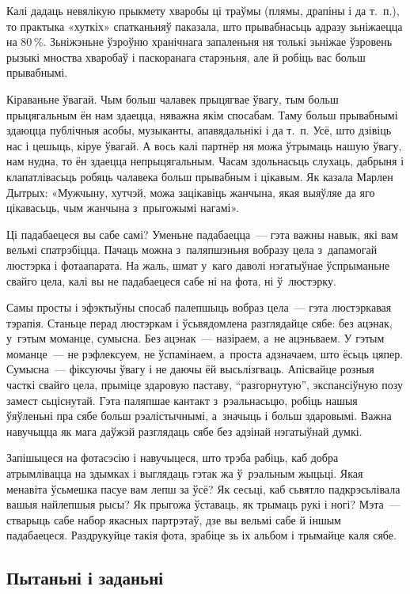 Калі дадаць невялікую прыкмету хваробы ці траўмы (плямы, драпіны і да т.~п.), то практыка «хуткіх» спатканьняў паказала, што прывабнасьць адразу зьніжаецца на 80\,\%. Зьніжэньне ўзроўню хранічнага запаленьня ня толькі зьніжае ўзровень рызыкі мноства хваробаў і паскоранага старэньня, але й робіць вас больш прывабнымі.

Кіраваньне ўвагай. Чым больш чалавек прыцягвае ўвагу, тым больш прыцягальным ён нам здаецца, няважна якім спосабам. Таму больш прывабнымі здаюцца публічныя асобы, музыканты, апавядальнікі і да т.~п. Усё, што дзівіць нас і цешыць, кіруе ўвагай. А вось калі партнёр ня можа ўтрымаць нашую ўвагу, нам нудна, то ён здаецца непрыцягальным. Часам здольнасьць слухаць, дабрыня і клапатлівасьць робяць чалавека больш прывабным і цікавым. Як казала Марлен Дытрых: «Мужчыну, хутчэй, можа зацікавіць жанчына, якая выяўляе да яго цікавасьць, чым жанчына з~прыгожымі нагамі».

Ці падабаецеся вы сабе самі? Уменьне падабаецца~--- гэта важны навык, які вам вельмі спатрэбіцца. Пачаць можна з~паляпшэньня вобразу цела з~дапамогай люстэрка і фотаапарата. На жаль, шмат у~каго даволі нэгатыўнае ўспрыманьне свайго цела, калі вы не падабаецеся сабе ні на фота, ні ў~люстэрку.

Самы просты і эфэктыўны спосаб палепшыць вобраз цела~--- гэта люстэркавая тэрапія. Станьце перад люстэркам і ўсьвядомлена разглядайце сябе: без ацэнак, у~гэтым моманце, сумысна. Без ацэнак~--- назіраем, а~не ацэньваем. У гэтым моманце~--- не рэфлексуем, не ўспамінаем, а~проста адзначаем, што ёсьць цяпер. Сумысна~--- фіксуючы ўвагу і не даючы ёй высьлізгваць. Апісвайце розныя часткі свайго цела, прыміце здаровую паставу, ``разгорнутую'', экспансіўную позу замест сьціснутай. Гэта паляпшае кантакт з~рэальнасьцю, робіць нашыя ўяўленьні пра сябе больш рэалістычнымі, а~значыць і больш здаровымі. Важна навучыцца як мага даўжэй разглядаць сябе без адзінай нэгатыўнай думкі.

Запішыцеся на фотасэсію і навучыцеся, што трэба рабіць, каб добра атрымлівацца на здымках і выглядаць гэтак жа ў~рэальным жыцьці. Якая менавіта ўсьмешка пасуе вам лепш за ўсё? Як сесьці, каб сьвятло падкрэсьлівала вашыя найлепшыя рысы? Як прыгожа ўставаць, як трымаць рукі і ногі? Мэта~--- стварыць сабе набор якасных партрэтаў, дзе вы вельмі сабе й іншым падабаецеся. Раздрукуйце такія фота, зрабіце зь іх альбом і трымайце каля сябе.

\subsection*{Пытаньні і заданьні}

